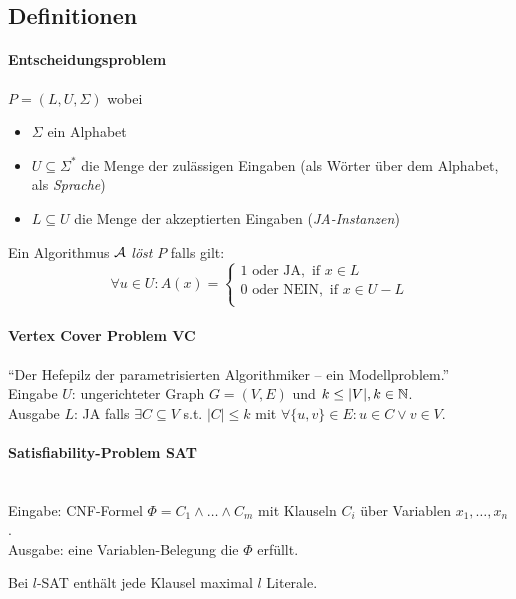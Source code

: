 \subsection{Definitionen}

\paragraph{Entscheidungsproblem}
$P = (L, U, \Sigma)$ wobei
\begin{itemize}
    \item $\Sigma$ ein Alphabet
    \item $U \subseteq \Sigma^*$ die Menge der zulässigen Eingaben (als Wörter über dem Alphabet, als \emph{Sprache})
    \item $L \subseteq U$ die Menge der akzeptierten Eingaben (\emph{JA-Instanzen})
\end{itemize}
Ein Algorithmus $\mathcal{A}$ \emph{löst} $P$ falls gilt:
$$ \forall u \in U : A(x) =
\begin{cases}
1 \text{ oder JA}, \text{ if } x \in L \\
0 \text{ oder NEIN}, \text{ if } x \in U-L \\
\end{cases}
$$

\paragraph{Vertex Cover Problem VC}
``Der Hefepilz der parametrisierten Algorithmiker -- ein Modellproblem.''
\\
Eingabe $U$: ungerichteter Graph $G = (V, E)$ und $k \leq |V|, k \in \mathbb{N}$. \\
Ausgabe $L$: JA falls $\exists C \subseteq V$ s.t. $|C| \leq k$ mit $\forall \{u, v \} \in E: u \in C \vee v \in V$.

\paragraph{Satisfiability-Problem SAT} \mbox{} \\
Eingabe: CNF-Formel $\Phi = C_1 \wedge \dots \wedge C_m$ mit Klauseln $C_i$ über Variablen $x_1, \dots, x_n$. \\
Ausgabe: eine Variablen-Belegung die $\Phi$ erfüllt.

Bei $l$-SAT enthält jede Klausel maximal $l$ Literale.

